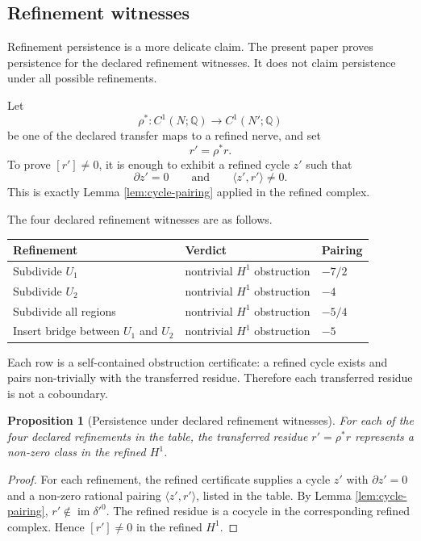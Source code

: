 \documentclass[11pt]{article}
\newtheorem{proposition}[theorem]{Proposition}
\newcommand{\im}{\operatorname{im}}
\newcommand{\Q}{\mathbb{Q}}
\begin{document}
\subsection{Refinement witnesses}

Refinement persistence is a more delicate claim. The present paper proves persistence for the declared refinement witnesses. It does not claim persistence under all possible refinements.

Let
\[
\rho^*:C^1(N;\Q)\to C^1(N';\Q)
\]
be one of the declared transfer maps to a refined nerve, and set
\[
r'=\rho^*r.
\]
To prove \([r']\neq 0\), it is enough to exhibit a refined cycle \(z'\) such that
\[
\partial z'=0
\qquad\text{and}\qquad
\langle z',r'\rangle\neq 0.
\]
This is exactly Lemma \ref{lem:cycle-pairing} applied in the refined complex.

The four declared refinement witnesses are as follows.

\begin{center}
\begin{tabular}{lll}
\toprule
Refinement & Verdict & Pairing \\
\midrule
Subdivide \(U_1\) & nontrivial \(H^1\) obstruction & \(-7/2\) \\
Subdivide \(U_2\) & nontrivial \(H^1\) obstruction & \(-4\) \\
Subdivide all regions & nontrivial \(H^1\) obstruction & \(-5/4\) \\
Insert bridge between \(U_1\) and \(U_2\) & nontrivial \(H^1\) obstruction & \(-5\) \\
\bottomrule
\end{tabular}
\end{center}

Each row is a self-contained obstruction certificate: a refined cycle exists and pairs non-trivially with the transferred residue. Therefore each transferred residue is not a coboundary.

\begin{proposition}[Persistence under declared refinement witnesses]
For each of the four declared refinements in the table, the transferred residue \(r'=\rho^*r\) represents a non-zero class in the refined \(H^1\).
\end{proposition}

\begin{proof}
For each refinement, the refined certificate supplies a cycle \(z'\) with \(\partial z'=0\) and a non-zero rational pairing \(\langle z',r'\rangle\), listed in the table. By Lemma \ref{lem:cycle-pairing}, \(r'\notin \im\delta'^0\). The refined residue is a cocycle in the corresponding refined complex. Hence \([r']\neq 0\) in the refined \(H^1\).
\end{proof}
\end{document}
